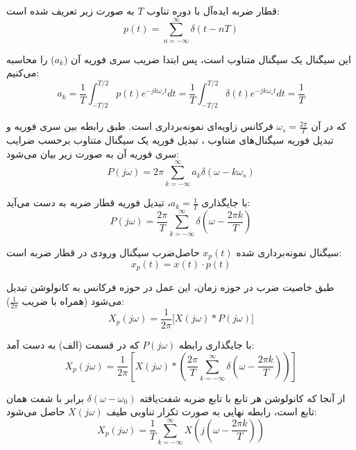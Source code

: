 
قطار ضربه ایده‌آل با دوره تناوب $T$ به صورت زیر تعریف شده است:
\begin{equation*}
p(t) = \sum_{n=-\infty}^{\infty} \delta(t - nT)
\end{equation*}

این سیگنال یک سیگنال متناوب است، پس ابتدا ضریب سری فوریه آن ($a_k$) را محاسبه می‌کنیم:
\begin{equation*}
a_k = \frac{1}{T} \int_{-T/2}^{T/2} p(t) e^{-jk\omega_s t} dt = \frac{1}{T} \int_{-T/2}^{T/2} \delta(t) e^{-jk\omega_s t} dt = \frac{1}{T}
\end{equation*}

که در آن $\omega_s = \frac{2\pi}{T}$ فرکانس زاویه‌ای نمونه‌برداری است. طبق 
رابطه بین سری فوریه و تبدیل فوریه سیگنال‌های متناوب
، تبدیل فوریه یک سیگنال متناوب برحسب ضرایب سری فوریه آن به صورت زیر بیان می‌شود:
\begin{equation*}
P(j\omega) = 2\pi \sum_{k=-\infty}^{\infty} a_k \delta(\omega - k\omega_s)
\end{equation*}

با جایگذاری $a_k = \frac{1}{T}$، تبدیل فوریه قطار ضربه به دست می‌آید:
\begin{equation*}
P(j\omega) = \frac{2\pi}{T} \sum_{k=-\infty}^{\infty} \delta\left(\omega - \frac{2\pi k}{T}\right)
\end{equation*}


سیگنال نمونه‌برداری شده $x_p(t)$ حاصل‌ضرب سیگنال ورودی در قطار ضربه است:
\begin{equation*}
x_p(t) = x(t) \cdot p(t)
\end{equation*}

طبق خاصیت ضرب در حوزه زمان، این عمل در حوزه فرکانس به کانولوشن تبدیل می‌شود (همراه با ضریب $\frac{1}{2\pi}$):
\begin{equation*}
X_p(j\omega) = \frac{1}{2\pi} \Big[ X(j\omega) * P(j\omega) \Big]
\end{equation*}

با جایگذاری رابطه $P(j\omega)$ که در قسمت (الف) به دست آمد:
\begin{equation*}
X_p(j\omega) = \frac{1}{2\pi} \left[ X(j\omega) * \left( \frac{2\pi}{T} \sum_{k=-\infty}^{\infty} \delta\left(\omega - \frac{2\pi k}{T}\right) \right) \right]
\end{equation*}

از آنجا که کانولوشن هر تابع با تابع ضربه شفت‌یافته $\delta(\omega - \omega_0)$ برابر با شفت همان تابع است، رابطه نهایی به صورت تکرار تناوبی طیف $X(j\omega)$ حاصل می‌شود:
\begin{equation*}
X_p(j\omega) = \frac{1}{T} \sum_{k=-\infty}^{\infty} X\left(j\left(\omega - \frac{2\pi k}{T}\right)\right)
\end{equation*}

